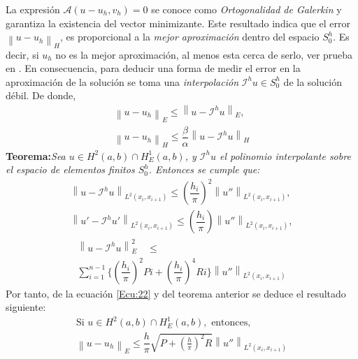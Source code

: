 \documentclass[12pt]{article}
\begin{document}
La expresión $\mathcal{A}(u-u_h,v_h)=0$ se conoce como \textit{Ortogonalidad de Galerkin} y garantiza la existencia del vector minimizante. Este resultado indica que el error $\left\| u-u_h\right \|_H$, es proporcional a la \textit{mejor aproximación} dentro del espacio $S_0^h$. Es decir, si $u_h$ no es la mejor aproximación, al menos esta cerca de serlo, ver prueba en \cite{Lib04}. En consecuencia, para deducir una forma de medir el error en la aproximación de la solución se toma una \textit{interpolación} $\mathcal{I}^hu \in S_0^h$ de la solución débil. De donde,
\begin{equation}
\begin{array}{c}
\left\| u- u_h\right \|_E \leq \left\| u-\mathcal{I}^hu\right\|_E,\\[0.3cm]

\left\| u- u_h\right \|_H \leq \dfrac{\beta}{\alpha}\left\| u-\mathcal{I}^hu\right\|_H
\label{Ecu:22}
\end{array}
\end{equation}
{\bf Teorema:}{\em Sea $ \textit{u} \in H^2(a,b)\cap H_E^1(a,b) $, y $\mathcal{I}^hu$ el polinomio interpolante sobre el espacio de elementos finitos $S_0^h$. Entonces se cumple que:
	\begin{equation*}\label{Ecu:23}
	\begin{array}{c}
	\left\| u- \mathcal{I}^hu\right \|_{L^2(x_i,x_{i+1})} \leq (\dfrac{h_i}{\pi})^2\left\| u''\right \|_{L^2(x_i,x_{i+1})},\\
\left\| u'- \mathcal{I}^hu'\right \|_{L^2(x_i,x_{i+1})} \leq (\dfrac{h_i}{\pi})\left\| u''\right \|_{L^2(x_i,x_{i+1})},
	\end{array}
\end{equation*}
\begin{equation*}\label{Ecu:24}
\begin{array}{c}
\left\| u- \mathcal{I}^hu\right \|_E^2 \quad \leq\\ \sum_{i=1}^{n-1}\lbrace (\dfrac{h_i}{\pi})^2Pi + (\dfrac{h_i}{\pi})^4Ri \rbrace\left\| u''\right \|_{L^2(x_i,x_{i+1})}
\end{array}
\end{equation*}}
Por tanto, de la ecuación \eqref{Ecu:22} y del teorema anterior se deduce el resultado siguiente:
\begin{equation*}\label{Ecu:25}
\begin{array}{c}
\text{Si } \textit{u} \in H^2(a,b)\cap H_E^1(a,b), \text{ entonces, }\\

\left\| u- u_h\right \|_E \leq\dfrac{h}{\pi}\sqrt{P + (\frac{h}{\pi})^2R}\left\| u''\right \|_{L^2(x_i,x_{i+1})}
\end{array}
\end{equation*}
\end{document}
